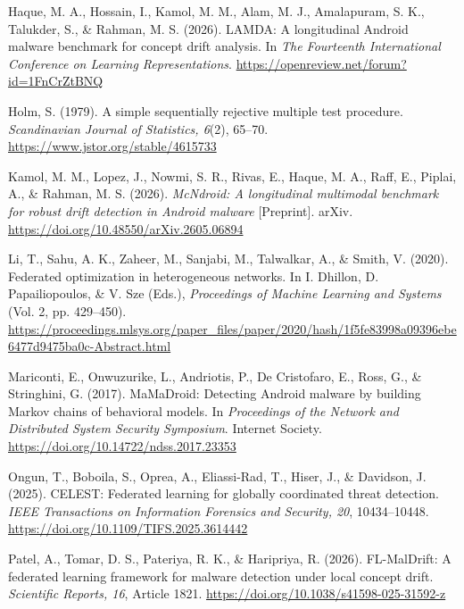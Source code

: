 \documentclass[12pt,letterpaper]{article}
\newenvironment{references}{\begin{list}{}{\setlength{\leftmargin}{0.5in}\setlength{\itemindent}{-0.5in}\setlength{\itemsep}{0pt}\setlength{\parsep}{0pt}\setlength{\topsep}{0pt}}\raggedright}{\end{list}}
\begin{document}
\begin{references}
\item Haque, M. A., Hossain, I., Kamol, M. M., Alam, M. J., Amalapuram, S. K., Talukder, S., \& Rahman, M. S. (2026). LAMDA: A longitudinal Android malware benchmark for concept drift analysis. In \textit{The Fourteenth International Conference on Learning Representations}. \url{https://openreview.net/forum?id=1FnCrZtBNQ}

\item Holm, S. (1979). A simple sequentially rejective multiple test procedure. \textit{Scandinavian Journal of Statistics, 6}(2), 65–70. \url{https://www.jstor.org/stable/4615733}

\item Kamol, M. M., Lopez, J., Nowmi, S. R., Rivas, E., Haque, M. A., Raff, E., Piplai, A., \& Rahman, M. S. (2026). \textit{McNdroid: A longitudinal multimodal benchmark for robust drift detection in Android malware} [Preprint]. arXiv. \url{https://doi.org/10.48550/arXiv.2605.06894}

\item Li, T., Sahu, A. K., Zaheer, M., Sanjabi, M., Talwalkar, A., \& Smith, V. (2020). Federated optimization in heterogeneous networks. In I. Dhillon, D. Papailiopoulos, \& V. Sze (Eds.), \textit{Proceedings of Machine Learning and Systems} (Vol. 2, pp. 429–450). \url{https://proceedings.mlsys.org/paper_files/paper/2020/hash/1f5fe83998a09396ebe6477d9475ba0c-Abstract.html}

\item Mariconti, E., Onwuzurike, L., Andriotis, P., De Cristofaro, E., Ross, G., \& Stringhini, G. (2017). MaMaDroid: Detecting Android malware by building Markov chains of behavioral models. In \textit{Proceedings of the Network and Distributed System Security Symposium}. Internet Society. \url{https://doi.org/10.14722/ndss.2017.23353}

\item Ongun, T., Boboila, S., Oprea, A., Eliassi-Rad, T., Hiser, J., \& Davidson, J. (2025). CELEST: Federated learning for globally coordinated threat detection. \textit{IEEE Transactions on Information Forensics and Security, 20}, 10434–10448. \url{https://doi.org/10.1109/TIFS.2025.3614442}

\item Patel, A., Tomar, D. S., Pateriya, R. K., \& Haripriya, R. (2026). FL-MalDrift: A federated learning framework for malware detection under local concept drift. \textit{Scientific Reports, 16}, Article 1821. \url{https://doi.org/10.1038/s41598-025-31592-z}


\end{references}
\end{document}
